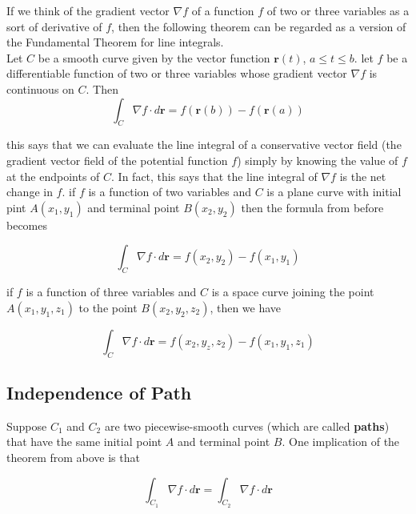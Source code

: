 \documentclass{article}
\begin{document}
If we think of the gradient vector $\nabla f$ of a function $f$ of two or three variables as a sort of derivative of $f$, then the following theorem can be regarded as a version of the Fundamental Theorem for line integrals. 
\\

Let $C$ be a smooth curve given by the vector function $\mathbf{r}(t)$, $a \leq t \leq b$. let $f$ be a differentiable function of two or three variables whose gradient vector $\nabla f$ is continuous on $C$. Then
\begin{equation*}
    \int_C \nabla f \cdot d \mathbf{r} = f(\mathbf{r}(b)) - f(\mathbf{r}(a))
\end{equation*}

this says that we can evaluate the line integral of a conservative vector field (the gradient vector field of the potential function $f$) simply by knowing the value of $f$ at the endpoints of $C$. In fact, this says that the line integral of $\nabla f$ is the net change in $f$. if $f$ is a function of two variables and $C$ is a plane curve with initial pint $A(x_1, y_1)$ and terminal point $B(x_2,y_2)$ then the formula from before becomes 

\begin{equation*}
    \int_C \nabla f \cdot d \mathbf{r} = f(x_2,y_2) - f(x_1, y_1)
\end{equation*}

if $f$ is a function of three variables and $C$ is a space curve joining the point $A(x_1, y_1, z_1)$ to the point $B(x_2, y_2, z_2)$, then we have

\begin{equation*}
    \int_C \nabla f \cdot d \mathbf{r} = f(x_2,y_z,z_2) - f(x_1, y_1, z_1)
\end{equation*}

\subsection{Independence of Path}

Suppose $C_1$ and $C_2$ are two piecewise-smooth curves (which are called \textbf{paths}) that have the same initial point $A$ and terminal point $B$. One implication of the theorem from above is that 

\begin{equation*}
    \int_{C_1} \nabla f \cdot d \mathbf{r} = \int_{C_2} \nabla f \cdot d \mathbf{r} 
\end{equation*}
\end{document}
